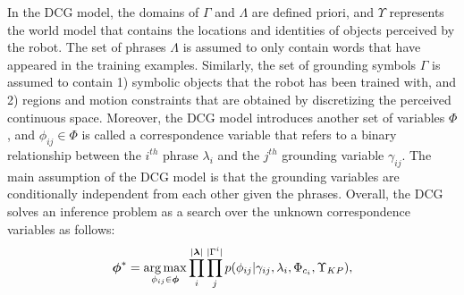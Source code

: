 In the DCG model, the domains of $\Gamma$ and $\Lambda$ are defined priori, and $\Upsilon$ represents the world model that contains the locations and identities of objects perceived by the robot. %
The set of phrases $\Lambda$ is assumed to only contain words that have appeared in the training examples. Similarly, the set of grounding symbols $\Gamma$ is assumed to contain 1) symbolic objects that the robot has been trained with, and 2) regions and motion constraints that are obtained by discretizing the perceived continuous space.  Moreover, the DCG model introduces another set of variables $\Phi$, and $\phi_{ij} \in \Phi$ is called a correspondence variable that refers to a binary relationship between the $i^{th}$ phrase $\lambda_i$ and the $j^{th}$ grounding variable $\gamma_{ij}$. The main assumption of the DCG model is that the grounding variables are conditionally independent from each other given the phrases. Overall, the DCG solves an inference problem as a search over the unknown correspondence variables as follows:  
\begin{equation}
\label{eq:dcg_factored1}
\begin{split}
\boldsymbol{\phi}^* = \operatorname*{\arg\max}_{\phi_{ij} \in \boldsymbol{\phi}} \prod_{i}^{| \boldsymbol{\lambda}|} \prod_{j}^{|\Gamma^i|} p(\phi_{ij}|\gamma_{ij},\lambda_i, \Phi_{c_{i}}, \Upsilon_{KP}),
\end{split}
\end{equation}
